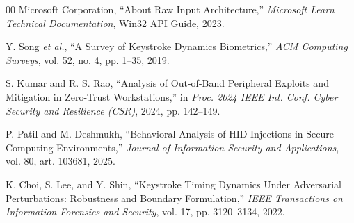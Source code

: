 \documentclass[conference]{IEEEtran}
\begin{document}
\begin{thebibliography}{00}
 Microsoft Corporation, ``About Raw Input Architecture,'' \emph{Microsoft Learn Technical Documentation}, Win32 API Guide, 2023.

 Y. Song \emph{et al.}, ``A Survey of Keystroke Dynamics Biometrics,'' \emph{ACM Computing Surveys}, vol. 52, no. 4, pp. 1--35, 2019.

 S. Kumar and R. S. Rao, ``Analysis of Out-of-Band Peripheral Exploits and Mitigation in Zero-Trust Workstations,'' in \emph{Proc. 2024 IEEE Int. Conf. Cyber Security and Resilience (CSR)}, 2024, pp. 142--149.

 P. Patil and M. Deshmukh, ``Behavioral Analysis of HID Injections in Secure Computing Environments,'' \emph{Journal of Information Security and Applications}, vol. 80, art. 103681, 2025.

 K. Choi, S. Lee, and Y. Shin, ``Keystroke Timing Dynamics Under Adversarial Perturbations: Robustness and Boundary Formulation,'' \emph{IEEE Transactions on Information Forensics and Security}, vol. 17, pp. 3120--3134, 2022.

\end{thebibliography}
\end{document}
